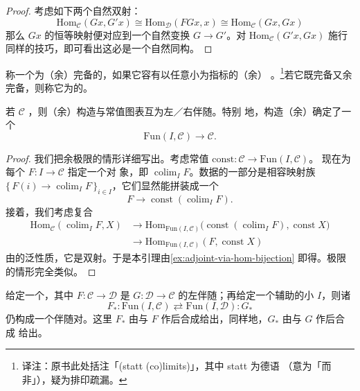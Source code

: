 \begin{proof}
考虑如下两个自然双射：
\[
\mathrm{Hom}_{\mathcal{C}}(Gx, G'x) \cong
\mathrm{Hom}_{\mathcal{D}}(FGx, x) \cong
\mathrm{Hom}_{\mathcal{C}}(Gx, Gx)
\]
那么 $Gx$ 的恒等映射便对应到一个自然变换 $G \to G'$。对
$\mathrm{Hom}_{\mathcal{C}}(G'x, Gx)$ 施行同样的技巧，即可看出这必是一个自然同构。
\end{proof}

\begin{definition}\label{def:bicomplete}
称一个\trCategory{}为（余）完备的，如果它容有以任意小\trCategory{}为指标的（余）
\trLimit{}。\footnote{译注：原书此处括注「(statt (co)limits)」，其中 statt 为德语
（意为「而非」），疑为排印疏漏。}若它既完备又余完备，则称它为\trBicomplete{}的。
\end{definition}

\begin{lemma}\label{lem:colimit-adjoint-constant}
若 $\mathcal{C}$ \trBicomplete{}，则（余）\trLimit{}构造与常值图表\trFunctor{}互为左／右伴随。特别
地，构造（余）\trLimit{}确定了一个\trFunctor{}%
\[
\mathrm{Fun}(I, \mathcal{C}) \to \mathcal{C}.
\]
\end{lemma}
\begin{proof}
我们把余极限的情形详细写出。考虑常值\trFunctor{} $\mathrm{const}\colon \mathcal{C} \to \mathrm{Fun}(I,\mathcal{C})$。
现在为每个\trFunctor{} $F\colon I \to \mathcal{C}$ 指定一个对
象，即 $\operatorname{colim}_I F$。\trColimit{}数据的一部分是相容映射族
$\{\, F(i) \to \operatorname{colim}_I F \,\}_{i \in I}$，它们显然能拼装成一个%
\trNaturalTransformation{}%
\[
F \to \operatorname{const}(\operatorname{colim}_I F).
\]
接着，我们考虑复合
\[
\begin{aligned}
\mathrm{Hom}_{\mathcal{C}}(\operatorname{colim}_I F, X) &\to
\mathrm{Hom}_{\mathrm{Fun}(I,\mathcal{C})}\bigl(\operatorname{const}
(\operatorname{colim}_I F), \operatorname{const} X\bigr) \\
&\to
\mathrm{Hom}_{\mathrm{Fun}(I,\mathcal{C})}(F, \operatorname{const} X)
\end{aligned}
\]
由\trColimit{}的泛性质，它是双射。于是本引理由\cref{ex:adjoint-via-hom-bijection} 即得。极限的情形完全类似。
\end{proof}

\begin{lemma}\label{lem:post-composition-adjoint}
给定一个\trAdjunction{}，其中 $F\colon \mathcal{C} \to \mathcal{D}$ 是
$G\colon \mathcal{D} \to \mathcal{C}$ 的左伴随；再给定一个辅助的小\trCategory{}%
$I$，则诸\trFunctor{}%
\[
F_*\colon \mathrm{Fun}(I,\mathcal{C})
\rightleftarrows \mathrm{Fun}(I,\mathcal{D})\colon G_*
\]
仍构成一个伴随对。这里 $F_*$ 由与 $F$ 作后合成给出，同样地，$G_*$ 由与 $G$ 作后合成
给出。
\end{lemma}


